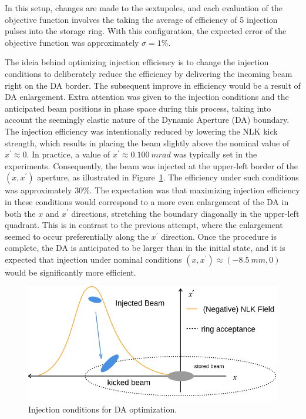 In this setup, changes are made to the sextupoles, and each evaluation of the objective function involves the taking the average of efficiency of 5 injection pulses into the storage ring. With this configuration, the expected error of the objective function was approximately $\sigma=1\%$.

The ideia behind optimizing injection efficiency is to change the injection conditions to deliberately reduce the efficiency by delivering the incoming beam right on the DA border. The subsequent improve in efficiency would be a result of DA enlargement. Extra attention was given to the injection conditions and the anticipated beam positions in phase space during this process, taking into account the seemingly elastic nature of the Dynamic Aperture (DA) boundary. The injection efficiency was intentionally reduced by lowering the NLK kick strength, which results in placing the beam slightly above the nominal value of $x^\prime\approx 0$. In practice, a value of $x^\prime\approx 0.100~\unit{mrad}$ was typically set in the experiments. Consequently, the beam was injected at the upper-left border of the $(x,x^\prime)$ aperture, as illustrated in Figure~\ref{fig:inj_cond}. The efficiency under such conditions was approximately $30\%$. The expectation was that maximizing injection efficiency in these conditions would correspond to a more even enlargement of the DA in both the $x$ and $x^{\prime}$ directions, stretching the boundary diagonally in the upper-left quadrant. This is in contrast to the previous attempt, where the enlargement seemed to occur preferentially along the $x^\prime$ direction. Once the procedure is complete, the DA is anticipated to be larger than in the initial state, and it is expected that injection under nominal conditions $(x, x^\prime)\approx(-8.5~\unit{mm}, 0)$ would be significantly more efficient.
\begin{figure}[t]
    \centering
    \includegraphics[width=0.7\columnwidth]{Images/inj_cond.png}
    \caption[Injection conditions for DA optimization.]{Injection conditions for DA optimization.}
    \label{fig:inj_cond}
\end{figure}


